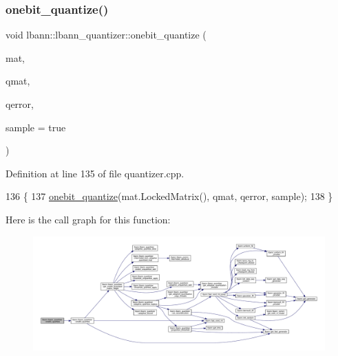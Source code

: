 \subsubsection{\texorpdfstring{onebit\+\_\+quantize()}{onebit\_quantize()}\hspace{0.1cm}{\footnotesize\ttfamily [2/2]}}
{\footnotesize\ttfamily void lbann\+::lbann\+\_\+quantizer\+::onebit\+\_\+quantize (\begin{DoxyParamCaption}\item[{const \hyperlink{base_8hpp_a0fab5387556805cfeac3e7e567bf66c5}{Dist\+Mat} \&}]{mat,  }\item[{\hyperlink{classlbann_1_1lbann__quantizer_a399f3f8c393b6021b43e95d1ce6ea28c}{Quantized\+Matrix} \&}]{qmat,  }\item[{\hyperlink{base_8hpp_a68f11fdc31b62516cb310831bbe54d73}{Mat} \&}]{qerror,  }\item[{bool}]{sample = {\ttfamily true} }\end{DoxyParamCaption})}



Definition at line 135 of file quantizer.\+cpp.


\begin{DoxyCode}
136                                                                 \{
137   \hyperlink{classlbann_1_1lbann__quantizer_a4dd4696cbbfd93c73e5fb3c40fcb16c3}{onebit\_quantize}(mat.LockedMatrix(), qmat, qerror, sample);
138 \}
\end{DoxyCode}
Here is the call graph for this function\+:\nopagebreak
\begin{figure}[H]
\begin{center}
\leavevmode
\includegraphics[width=350pt]{classlbann_1_1lbann__quantizer_a9eeb89150026bf4b7bea15bffdba10d3_cgraph}
\end{center}
\end{figure}
\mbox{\label{classlbann_1_1lbann__quantizer_ad5592daa122b40c275cce3dc93bba41e}} 
